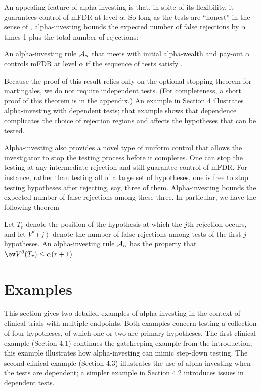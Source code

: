 \documentclass[12pt]{article}
\begin{document}
 
 An appealing feature of alpha-investing is that, in spite of its flexibility,
 it guarantees control of mFDR at level $\alpha$.  So long as the tests are
 ``honest'' in the sense of , alpha-investing bounds the expected
 number of false rejections by $\alpha$ times 1 plus the total number of
 rejections:
\begin{theorem} \label{th:main} An alpha-investing rule ${\cal
 A}_\alpha$ that meets  with initial alpha-wealth and pay-out
 $\alpha$ controls mFDR at level $\alpha$ if the sequence of tests satisfy
 .
\label{eq:theorem1}
\end{theorem}
 Because the proof of this result relies only on the optional stopping theorem
 for martingales, we do not require independent tests.  (For completeness, a
 short proof of this theorem is in the appendix.)  An example in Section 4
 illustrates alpha-investing with dependent tests; that example shows that
 dependence complicates the choice of rejection regions and affects the
 hypotheses that can be tested.  


 Alpha-investing also provides a novel type of uniform control that allows the
 investigator to stop the testing process before it completes.  One can stop the
 testing at any intermediate rejection and still guarantee control of mFDR.  For
 instance, rather than testing all of a large set of hypotheses, one is free to
 stop testing hypotheses after rejecting, say, three of them.  Alpha-investing
 bounds the expected number of false rejections among these three.  In
 particular, we have the following theorem \citep{fosterstine08}
\begin{theorem}\label{thm:stopped}
 Let $T_{r}$ denote the position of the hypothesis at which the $j$th rejection
 occurs, and let $V^\theta(j)$ denote the number of false rejections among tests
 of the first $j$ hypotheses.  An alpha-investing rule ${\cal A}_\alpha$ has the
 property that $\ev V^\theta(T_{r}) \le \alpha(r+1)$
\end{theorem}



\section{Examples}     %

 This section gives two detailed examples of alpha-investing in the context of
 clinical trials with multiple endpoints.  Both examples concern testing a
 collection of four hypotheses, of which one or two are primary hypotheses.  The
 first clinical example (Section 4.1) continues the gatekeeping example from the
 introduction; this example illustrates how alpha-investing can mimic step-down
 testing.  The second clinical example (Section 4.3) illustrates the use of
 alpha-investing when the tests are dependent; a simpler example in Section 4.2
 introduces issues in dependent tests.
\end{document}
